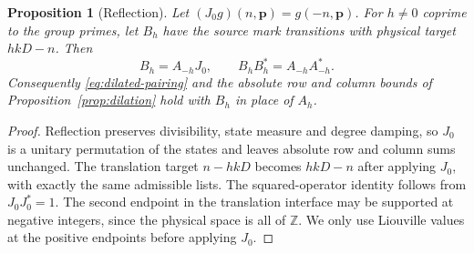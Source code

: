 \documentclass[11pt]{article}
\newtheorem{proposition}[theorem]{Proposition}
\theoremstyle{definition}
\newcommand{\Z}{\mathbb Z}
\theoremstyle{remark}
\begin{document}
\begin{proposition}[Reflection]\label{prop:reflection}
Let $(J_0g)(n,\mathbf p)=g(-n,\mathbf p)$. For $h\ne0$ coprime to
the group primes, let $B_h$ have the source mark transitions with
physical target $hkD-n$. Then
\begin{equation}\label{eq:reflection}
B_h=A_{-h}J_0,\qquad B_hB_h^*=A_{-h}A_{-h}^*.
\end{equation}
Consequently \eqref{eq:dilated-pairing} and the absolute row and column
bounds of Proposition~\ref{prop:dilation} hold with $B_h$ in place of
$A_h$.
\end{proposition}
\begin{proof}
Reflection preserves divisibility, state measure and degree damping,
so $J_0$ is a unitary permutation of the states and leaves absolute
row and column sums unchanged. The translation target $n-hkD$ becomes $hkD-n$
after applying $J_0$, with exactly the same admissible lists.
The squared-operator identity follows from $J_0J_0^*=1$.
The second endpoint in the translation interface may be supported
at negative integers, since the physical space is all of $\Z$.
We only use Liouville values at the positive endpoints before applying
$J_0$.
\end{proof}
\end{document}
